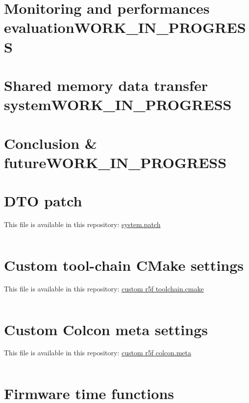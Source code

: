 \documentclass[10pt]{article}
\begin{document}
\section{Monitoring and performances evaluation\hfill{}\textsc{WORK\_IN\_PROGRESS}}
\label{sec:org0f1b83c}

\clearpage
\section{Shared memory data transfer system\hfill{}\textsc{WORK\_IN\_PROGRESS}}
\label{sec:org82ed90f}


\clearpage
\section{Conclusion \& future\hfill{}\textsc{WORK\_IN\_PROGRESS}}
\label{sec:org903addd}

\clearpage
\appendix
\section{DTO patch}
\label{sec:orgf2349da}
This file is available in this repository: \href{https://gitlab.com/sunoc/xilinx-kria-kv260-documentation/-/blob/b7300116e153f4b5a1542f8804e4646db8030033/src/system.patch}{system.patch}
\inputminted[linenos, frame=single]{diff}{./src/system.patch}

\clearpage
\section{Custom tool-chain CMake settings}
\label{sec:org36a133b}
This file is available in this repository: \href{https://gitlab.com/sunoc/xilinx-kria-kv260-documentation/-/blob/b7300116e153f4b5a1542f8804e4646db8030033/src/custom\_r5f\_toolchain.cmake}{custom r5f toolchain.cmake}
\inputminted[linenos, frame=single]{cmake}{./src/custom_r5f_toolchain.cmake}

\clearpage
\section{Custom Colcon meta settings}
\label{sec:org7382156}
This file is available in this repository: \href{https://gitlab.com/sunoc/xilinx-kria-kv260-documentation/-/blob/b7300116e153f4b5a1542f8804e4646db8030033/src/custom\_r5f\_colcon.meta}{custom r5f colcon.meta}
\inputminted[linenos, frame=single]{yaml}{./src/custom_r5f_colcon.meta}

\clearpage
\section{Firmware time functions}
\label{sec:orgef4a496}
\end{document}
